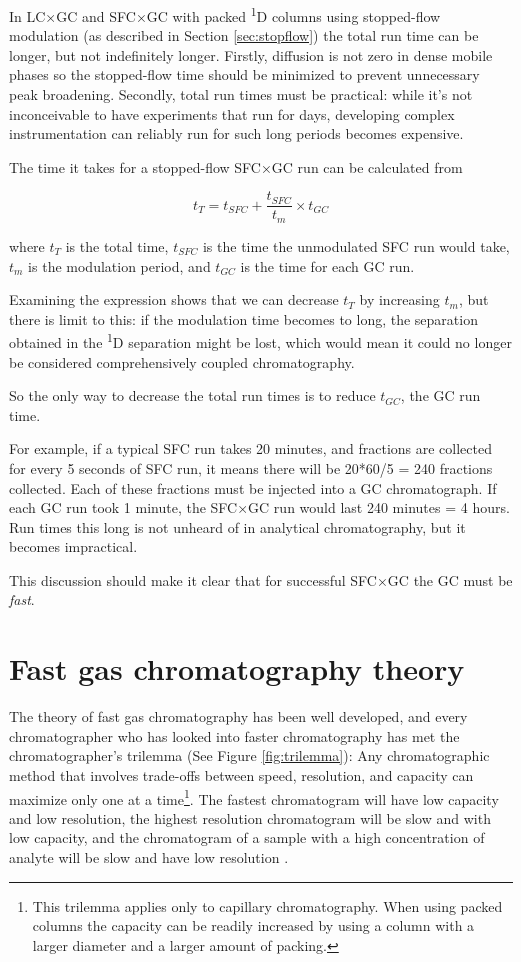 In LC×GC and SFC×GC with packed \textsuperscript{1}D columns using stopped-flow
modulation (as described in Section \ref{sec:stopflow}) the total run time can
be longer, but not indefinitely longer. Firstly, diffusion is not zero in dense
mobile phases so the stopped-flow time should be minimized to prevent
unnecessary peak broadening. Secondly, total run times must be practical: while
it's not inconceivable to have experiments that run for days, developing complex
instrumentation can reliably run for such long periods becomes expensive.

The time it takes for a stopped-flow SFC×GC run can be calculated from

\[t_{T} = t_{SFC} + \frac{t_{SFC}}{t_{m}} \times t_{GC}\]

where \(t_T\) is the total time, \(t_{SFC}\) is the time the unmodulated SFC run
would take, \(t_m\) is the modulation period, and \(t_{GC}\) is the time for
each GC run.

Examining the expression shows that we can decrease \(t_T\) by increasing
\(t_m\), but there is limit to this: if the modulation time becomes to long, the
separation obtained in the \textsuperscript{1}D separation might be lost, which
would mean it could no longer be considered comprehensively coupled
chromatography.

So the only way to decrease the total run times is to reduce \(t_{GC}\), the GC
run time.

For example, if a typical SFC run takes 20 minutes, and fractions are collected
for every 5 seconds of SFC run, it means there will be 20*60/5 = 240 fractions
collected. Each of these fractions must be injected into a GC chromatograph. If
each GC run took 1 minute, the SFC×GC run would last 240 minutes = 4 hours. Run
times this long is not unheard of in analytical chromatography, but it becomes
impractical.

This discussion should make it clear that for successful SFC×GC the GC
must be \textit{fast}.

\section{Fast gas chromatography theory}

The theory of fast gas chromatography has been well developed, and every chromatographer who has looked into faster
chromatography has met the chromatographer's trilemma (See Figure
\ref{fig:trilemma}): Any chromatographic method that involves trade-offs between
speed, resolution, and capacity can maximize only one at a time\footnote{This
trilemma applies only to capillary chromatography. When using packed columns the capacity
can be readily increased by using a column with a larger diameter and a larger
amount of packing.}. The fastest chromatogram will have low capacity and low
resolution, the highest resolution chromatogram will be slow and with low
capacity, and the chromatogram of a sample with a high concentration of analyte
will be slow and have low resolution \autocite{Klee2002}.

